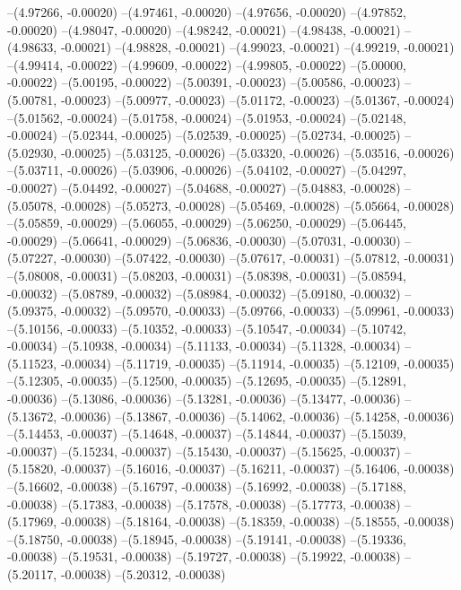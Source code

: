 --(4.97266, -0.00020)
--(4.97461, -0.00020)
--(4.97656, -0.00020)
--(4.97852, -0.00020)
--(4.98047, -0.00020)
--(4.98242, -0.00021)
--(4.98438, -0.00021)
--(4.98633, -0.00021)
--(4.98828, -0.00021)
--(4.99023, -0.00021)
--(4.99219, -0.00021)
--(4.99414, -0.00022)
--(4.99609, -0.00022)
--(4.99805, -0.00022)
--(5.00000, -0.00022)
--(5.00195, -0.00022)
--(5.00391, -0.00023)
--(5.00586, -0.00023)
--(5.00781, -0.00023)
--(5.00977, -0.00023)
--(5.01172, -0.00023)
--(5.01367, -0.00024)
--(5.01562, -0.00024)
--(5.01758, -0.00024)
--(5.01953, -0.00024)
--(5.02148, -0.00024)
--(5.02344, -0.00025)
--(5.02539, -0.00025)
--(5.02734, -0.00025)
--(5.02930, -0.00025)
--(5.03125, -0.00026)
--(5.03320, -0.00026)
--(5.03516, -0.00026)
--(5.03711, -0.00026)
--(5.03906, -0.00026)
--(5.04102, -0.00027)
--(5.04297, -0.00027)
--(5.04492, -0.00027)
--(5.04688, -0.00027)
--(5.04883, -0.00028)
--(5.05078, -0.00028)
--(5.05273, -0.00028)
--(5.05469, -0.00028)
--(5.05664, -0.00028)
--(5.05859, -0.00029)
--(5.06055, -0.00029)
--(5.06250, -0.00029)
--(5.06445, -0.00029)
--(5.06641, -0.00029)
--(5.06836, -0.00030)
--(5.07031, -0.00030)
--(5.07227, -0.00030)
--(5.07422, -0.00030)
--(5.07617, -0.00031)
--(5.07812, -0.00031)
--(5.08008, -0.00031)
--(5.08203, -0.00031)
--(5.08398, -0.00031)
--(5.08594, -0.00032)
--(5.08789, -0.00032)
--(5.08984, -0.00032)
--(5.09180, -0.00032)
--(5.09375, -0.00032)
--(5.09570, -0.00033)
--(5.09766, -0.00033)
--(5.09961, -0.00033)
--(5.10156, -0.00033)
--(5.10352, -0.00033)
--(5.10547, -0.00034)
--(5.10742, -0.00034)
--(5.10938, -0.00034)
--(5.11133, -0.00034)
--(5.11328, -0.00034)
--(5.11523, -0.00034)
--(5.11719, -0.00035)
--(5.11914, -0.00035)
--(5.12109, -0.00035)
--(5.12305, -0.00035)
--(5.12500, -0.00035)
--(5.12695, -0.00035)
--(5.12891, -0.00036)
--(5.13086, -0.00036)
--(5.13281, -0.00036)
--(5.13477, -0.00036)
--(5.13672, -0.00036)
--(5.13867, -0.00036)
--(5.14062, -0.00036)
--(5.14258, -0.00036)
--(5.14453, -0.00037)
--(5.14648, -0.00037)
--(5.14844, -0.00037)
--(5.15039, -0.00037)
--(5.15234, -0.00037)
--(5.15430, -0.00037)
--(5.15625, -0.00037)
--(5.15820, -0.00037)
--(5.16016, -0.00037)
--(5.16211, -0.00037)
--(5.16406, -0.00038)
--(5.16602, -0.00038)
--(5.16797, -0.00038)
--(5.16992, -0.00038)
--(5.17188, -0.00038)
--(5.17383, -0.00038)
--(5.17578, -0.00038)
--(5.17773, -0.00038)
--(5.17969, -0.00038)
--(5.18164, -0.00038)
--(5.18359, -0.00038)
--(5.18555, -0.00038)
--(5.18750, -0.00038)
--(5.18945, -0.00038)
--(5.19141, -0.00038)
--(5.19336, -0.00038)
--(5.19531, -0.00038)
--(5.19727, -0.00038)
--(5.19922, -0.00038)
--(5.20117, -0.00038)
--(5.20312, -0.00038)
